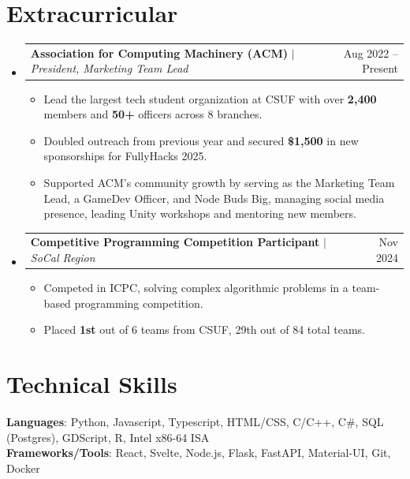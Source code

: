 \documentclass[letterpaper,11pt]{article}
\makeatletter
\newcommand{\resumeItem}[1]{
  \item\small{
    {#1 \vspace{-2pt}}
  }
}
\newcommand{\resumeProjectHeading}[2]{
    \item
    \begin{tabular*}{0.97\textwidth}{l@{\extracolsep{\fill}}r}
      \small#1 & #2 \\
    \end{tabular*}\vspace{-7pt}
}
\newcommand{\resumeSubHeadingListStart}{\begin{itemize}[leftmargin=0.15in, label={}]}
\newcommand{\resumeSubHeadingListEnd}{\end{itemize}}
\newcommand{\resumeItemListStart}{\begin{itemize}}
\newcommand{\resumeItemListEnd}{\end{itemize}\vspace{-5pt}}
\makeatother
\begin{document}
\section{Extracurricular}

    \resumeSubHeadingListStart
    
      \resumeProjectHeading
          {\textbf{Association for Computing Machinery (ACM)} $|$ \emph{President, Marketing Team Lead}}{Aug 2022 -- Present}
          \resumeItemListStart
            \resumeItem{Lead the largest tech student organization at CSUF with over \textbf{2,400} members and \textbf{50+} officers across 8 branches.}
            \resumeItem{Doubled outreach from previous year and secured \textbf{\$1,500} in new sponsorships for FullyHacks 2025.}
            \resumeItem{Supported ACM’s community growth by serving as the Marketing Team Lead, a GameDev Officer, and Node Buds Big, managing social media presence, leading Unity workshops and mentoring new members.}
          \resumeItemListEnd

      \resumeProjectHeading
          {\textbf{Competitive Programming Competition Participant} $|$ \emph{SoCal Region}}{Nov 2024}
          \resumeItemListStart
            \resumeItem{Competed in ICPC, solving complex algorithmic problems in a team-based programming competition.}
            \resumeItem{Placed \textbf{1st} out of 6 teams from CSUF, 29th out of 84 total teams.}
          \resumeItemListEnd
          
    \resumeSubHeadingListEnd


\section{Technical Skills}
 \begin{itemize}[leftmargin=0.15in, label={}]
    \small{\item{
     \textbf{Languages}{: Python, Javascript, Typescript, HTML/CSS, C/C++, C\#, SQL (Postgres), GDScript, R, Intel x86-64 ISA} \\
     \textbf{Frameworks/Tools}{: React, Svelte, Node.js, Flask, FastAPI, Material-UI, Git, Docker} \\
    }}
 \end{itemize}


\end{document}
